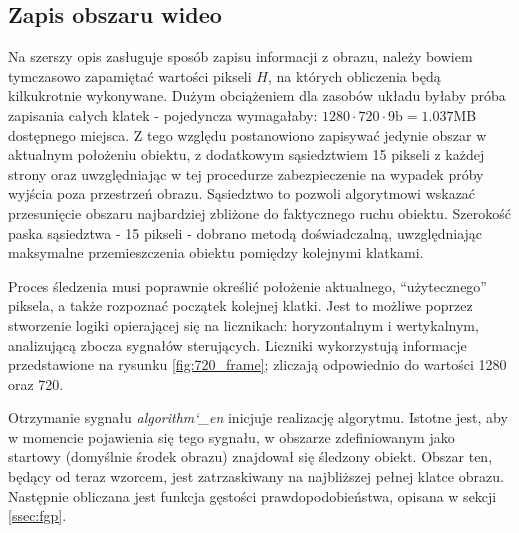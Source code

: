 \subsection{Zapis obszaru wideo}
\label{ssec:savideo}
Na szerszy opis zasługuje sposób zapisu informacji z obrazu, należy bowiem tymczasowo zapamiętać wartości pikseli $H$, na których obliczenia będą kilkukrotnie wykonywane. Dużym obciążeniem dla zasobów układu byłaby próba zapisania całych klatek - pojedyncza wymagałaby: $1280\cdot720\cdot9\text{b} = 1.037$MB dostępnego miejsca. Z tego względu postanowiono zapisywać jedynie obszar w aktualnym położeniu obiektu, z dodatkowym sąsiedztwiem 15 pikseli z każdej strony oraz uwzględniając w tej procedurze zabezpieczenie na wypadek próby wyjścia poza przestrzeń obrazu. Sąsiedztwo to pozwoli algorytmowi wskazać przesunięcie obszaru najbardziej zbliżone do faktycznego ruchu obiektu. Szerokość paska sąsiedztwa - 15 pikseli - dobrano metodą doświadczalną, uwzględniając maksymalne przemieszczenia obiektu pomiędzy kolejnymi klatkami.

Proces śledzenia  musi poprawnie określić położenie aktualnego, \enquote{użytecznego} piksela, a także rozpoznać początek kolejnej klatki. Jest to możliwe poprzez stworzenie logiki opierającej się na licznikach: horyzontalnym i wertykalnym, analizującą zbocza sygnałów sterujących. Liczniki wykorzystują informacje przedstawione na rysunku \ref{fig:720_frame}; zliczają odpowiednio do wartości 1280 oraz 720.

Otrzymanie sygnału \textit{algorithm\char`_en} inicjuje realizację algorytmu. Istotne jest, aby w momencie pojawienia się tego sygnału, w obszarze zdefiniowanym jako startowy (domyślnie środek obrazu) znajdował się śledzony obiekt. Obszar ten, będący od teraz wzorcem, jest zatrzaskiwany na najbliższej pełnej klatce obrazu. Następnie obliczana jest funkcja gęstości prawdopodobieństwa, opisana w sekcji \ref{ssec:fgp}.

